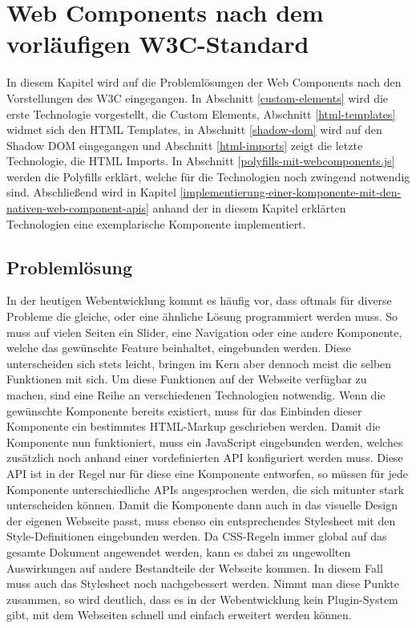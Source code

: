 \chapter{Web Components nach dem vorläufigen W3C-Standard}\label{web-components-nach-w3c}

In diesem Kapitel wird auf die Problemlösungen der Web Components nach den Vorstellungen des \ac{W3C} eingegangen. In Abschnitt \ref{custom-elements} wird die erste Technologie vorgestellt, die Custom Elements, Abschnitt \ref{html-templates} widmet sich den \ac{HTML} Templates, in Abschnitt \ref{shadow-dom} wird auf den Shadow \ac{DOM} eingegangen und Abschnitt \ref{html-imports} zeigt die letzte Technologie, die \ac{HTML} Imports. In Abschnitt \ref{polyfills-mit-webcomponents.js} werden die Polyfills erklärt, welche für die Technologien noch zwingend notwendig sind. Abschließend wird in Kapitel \ref{implementierung-einer-komponente-mit-den-nativen-web-component-apis} anhand der in diesem Kapitel erklärten Technologien eine exemplarische Komponente implementiert.


\section{Problemlösung}\label{problemloesung}

In der heutigen Webentwicklung kommt es häufig vor, dass oftmals für diverse Probleme die gleiche, oder eine ähnliche Lösung programmiert werden muss. So muss auf vielen Seiten ein Slider, eine Navigation oder eine andere Komponente, welche das gewünschte Feature beinhaltet, eingebunden werden. Diese unterscheiden sich stets leicht, bringen im Kern aber dennoch meist die selben Funktionen mit sich. Um diese Funktionen auf der Webseite verfügbar zu machen, sind eine Reihe an verschiedenen Technologien notwendig. Wenn die gewünschte Komponente bereits existiert, muss für das Einbinden dieser Komponente ein bestimmtes \ac{HTML}-Markup geschrieben werden. Damit die Komponente nun funktioniert, muss ein JavaScript eingebunden werden, welches zusätzlich noch anhand einer vordefinierten \ac{API} konfiguriert werden muss. Diese \ac{API} ist in der Regel nur für diese eine Komponente entworfen, so müssen für jede Komponente unterschiedliche \ac{API}s angesprochen werden, die sich mitunter stark unterscheiden können. Damit die Komponente dann auch in das visuelle Design der eigenen Webseite passt, muss ebenso ein entsprechendes Stylesheet mit den Style-Definitionen eingebunden werden. Da \ac{CSS}-Regeln immer global auf das gesamte Dokument angewendet werden, kann es dabei zu ungewollten Auswirkungen auf andere Bestandteile der Webseite kommen. In diesem Fall muss auch das Stylesheet noch nachgebessert werden. Nimmt man diese Punkte zusammen, so wird deutlich, dass es in der Webentwicklung kein Plugin-System gibt, mit dem Webseiten schnell und einfach erweitert werden können.

